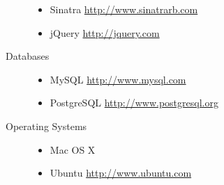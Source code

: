 \documentclass[a4paper,10pt]{article}
\begin{document}
\begin{description}
\begin{itemize}
      \item Sinatra \url{http://www.sinatrarb.com}
      \item jQuery \url{http://jquery.com}
    \end{itemize}
  \item[Databases] \hfill
    \begin{itemize}
      \item MySQL \url{http://www.mysql.com}
      \item PostgreSQL \url{http://www.postgresql.org}
    \end{itemize}
  \item[Operating Systems] \hfill
    \begin{itemize}
      \item Mac OS X
      \item Ubuntu \url{http://www.ubuntu.com}
    \end{itemize}
\end{description}

\end{document}
